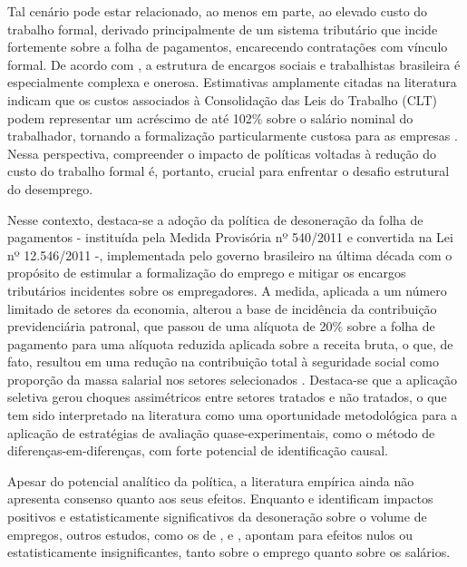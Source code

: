 \documentclass[12pt,a4paper,oneside]{article}
\begin{document}
		Tal cenário pode estar relacionado, ao menos em parte, ao elevado custo do trabalho
		formal, derivado principalmente de um sistema tributário que incide fortemente sobre a folha
		de pagamentos, encarecendo contratações com vínculo formal. De acordo com \citet{ansiliero2008}, a estrutura de encargos sociais e trabalhistas brasileira é especialmente complexa e onerosa. Estimativas amplamente citadas na literatura indicam que os custos associados à Consolidação das Leis do Trabalho (CLT) podem representar um acréscimo de até 102\% sobre o salário nominal do trabalhador, tornando a formalização particularmente custosa para as empresas \citep{Garcia2018}. Nessa perspectiva, compreender o impacto de políticas voltadas à redução do custo do trabalho formal é, portanto, crucial para enfrentar o desafio estrutural do desemprego.
		
		Nesse contexto, destaca-se a adoção da política de desoneração da folha de pagamentos
		- instituída pela Medida Provisória nº 540/2011 e convertida na Lei nº 12.546/2011 -, implementada pelo governo brasileiro na última década com o propósito de estimular a formalização do emprego e mitigar os encargos tributários incidentes sobre os empregadores. A medida, aplicada a um número limitado de setores da economia, alterou a base de incidência da contribuição previdenciária patronal, que passou de uma alíquota de 20\% sobre a folha de pagamento para uma alíquota reduzida aplicada sobre a receita bruta, o que, de fato, resultou em uma redução na contribuição total à seguridade social como proporção da massa salarial nos setores selecionados \citep{Scherer2015}. Destaca-se que a aplicação seletiva gerou choques assimétricos entre setores tratados e não tratados, o que tem sido interpretado na literatura como uma oportunidade metodológica para a aplicação de estratégias de avaliação quase-experimentais, como o método de diferenças-em-diferenças, com forte potencial de identificação causal. 
		
		Apesar do potencial analítico da política, a literatura empírica ainda não apresenta consenso quanto aos seus efeitos. Enquanto \citet{Scherer2015} e
		\citet{Souza2016} identificam impactos positivos e estatisticamente significativos da desoneração sobre o volume de empregos, outros estudos, como os de \citet{Garcia2018}, \citet{meyer2021} e \citet{docarmo2012}, apontam para
		efeitos nulos ou estatisticamente insignificantes, tanto sobre o emprego quanto sobre os salários.
		
\end{document}
